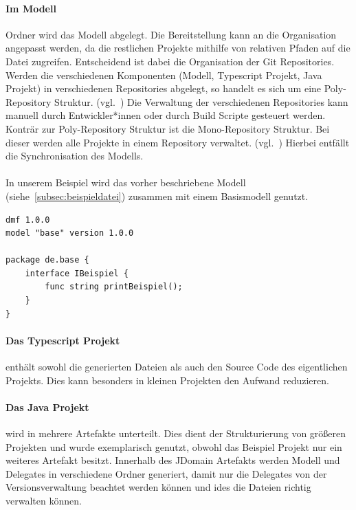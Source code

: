 \documentclass[./einleitung.tex]{subfiles}
\begin{document}
    \paragraph{Im Modell} Ordner wird das Modell abgelegt.
    Die Bereitstellung kann an die Organisation angepasst werden, da die restlichen Projekte mithilfe von relativen Pfaden auf die Datei zugreifen.
    Entscheidend ist dabei die Organisation der Git Repositories.
    Werden die verschiedenen Komponenten (Modell, Typescript Projekt, Java Projekt) in verschiedenen Repositories abgelegt, so handelt es sich um eine Poly-Repository Struktur. (vgl.~\cite{monorepo})
    Die Verwaltung der verschiedenen Repositories kann manuell durch Entwickler*innen oder durch Build Scripte gesteuert werden.
    Konträr zur Poly-Repository Struktur ist die Mono-Repository Struktur.
    Bei dieser werden alle Projekte in einem Repository verwaltet. (vgl.~\cite{monorepo})
    Hierbei entfällt die Synchronisation des Modells.
    \\\\
    In unserem Beispiel wird das vorher beschriebene Modell (siehe~\ref{subsec:beispieldatei}) zusammen mit einem Basismodell genutzt.
    \begin{lstlisting}[language=dmf, caption=Das Basismodell, label=lst:basismodell]
dmf 1.0.0
model "base" version 1.0.0

package de.base {
    interface IBeispiel {
        func string printBeispiel();
    }
}
    \end{lstlisting}

    \paragraph{Das Typescript Projekt} enthält sowohl die generierten Dateien als auch den Source Code des eigentlichen Projekts.
    Dies kann besonders in kleinen Projekten den Aufwand reduzieren.

    \paragraph{Das Java Projekt} wird in mehrere Artefakte unterteilt.
    Dies dient der Strukturierung von größeren Projekten und wurde exemplarisch genutzt, obwohl das Beispiel Projekt nur ein weiteres Artefakt besitzt.
    Innerhalb des JDomain Artefakts werden Modell und Delegates in verschiedene Ordner generiert, damit nur die Delegates von der Versionsverwaltung beachtet werden können und \acrshort{ide}s die Dateien richtig verwalten können.
\end{document}
